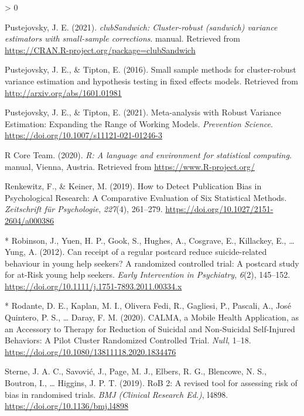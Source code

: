 \documentclass[
  english,
  man]{apa6}
\newlength{\cslhangindent}
\newenvironment{CSLReferences}[2] %
 {%
  \setlength{\parindent}{0pt}
  \ifodd #1 \everypar{\setlength{\hangindent}{\cslhangindent}}\ignorespaces\fi
  \ifnum #2 > 0
  \setlength{\parskip}{#2\baselineskip}
  \fi
 }%
 {}
\begin{document}
\begin{CSLReferences}{1}{0}
\leavevmode\hypertarget{ref-pustejovsky2021a}{}%
Pustejovsky, J. E. (2021). \emph{{clubSandwich}: Cluster-robust (sandwich) variance estimators with small-sample corrections}. manual. Retrieved from \url{https://CRAN.R-project.org/package=clubSandwich}

\leavevmode\hypertarget{ref-pustejovsky2016}{}%
Pustejovsky, J. E., \& Tipton, E. (2016). Small sample methods for cluster-robust variance estimation and hypothesis testing in fixed effects models. Retrieved from \url{http://arxiv.org/abs/1601.01981}

\leavevmode\hypertarget{ref-pustejovsky2021}{}%
Pustejovsky, J. E., \& Tipton, E. (2021). Meta-analysis with {Robust Variance Estimation}: Expanding the {Range} of {Working Models}. \emph{Prevention Science}. \url{https://doi.org/10.1007/s11121-021-01246-3}

\leavevmode\hypertarget{ref-rcoreteam2020}{}%
R Core Team. (2020). \emph{R: A language and environment for statistical computing}. manual, {Vienna, Austria}. Retrieved from \url{https://www.R-project.org/}

\leavevmode\hypertarget{ref-renkewitz2019}{}%
Renkewitz, F., \& Keiner, M. (2019). How to {Detect Publication Bias} in {Psychological Research}: A {Comparative Evaluation} of {Six Statistical Methods}. \emph{Zeitschrift für Psychologie}, \emph{227}(4), 261--279. \url{https://doi.org/10.1027/2151-2604/a000386}

\leavevmode\hypertarget{ref-robinson2012}{}%
* Robinson, J., Yuen, H. P., Gook, S., Hughes, A., Cosgrave, E., Killackey, E., \ldots{} Yung, A. (2012). Can receipt of a regular postcard reduce suicide-related behaviour in young help seekers? A randomized controlled trial: A postcard study for at-{Risk} young help seekers. \emph{Early Intervention in Psychiatry}, \emph{6}(2), 145--152. \url{https://doi.org/10.1111/j.1751-7893.2011.00334.x}

\leavevmode\hypertarget{ref-rodante2020}{}%
* Rodante, D. E., Kaplan, M. I., Olivera Fedi, R., Gagliesi, P., Pascali, A., José Quintero, P. S., \ldots{} Daray, F. M. (2020). {CALMA}, a {Mobile Health Application}, as an {Accessory} to {Therapy} for {Reduction} of {Suicidal} and {Non}-{Suicidal Self}-{Injured Behaviors}: A {Pilot Cluster Randomized Controlled Trial}. \emph{Null}, 1--18. \url{https://doi.org/10.1080/13811118.2020.1834476}

\leavevmode\hypertarget{ref-sterne2019}{}%
Sterne, J. A. C., Savović, J., Page, M. J., Elbers, R. G., Blencowe, N. S., Boutron, I., \ldots{} Higgins, J. P. T. (2019). {RoB} 2: A revised tool for assessing risk of bias in randomised trials. \emph{BMJ (Clinical Research Ed.)}, l4898. \url{https://doi.org/10.1136/bmj.l4898}


\end{CSLReferences}
\end{document}
